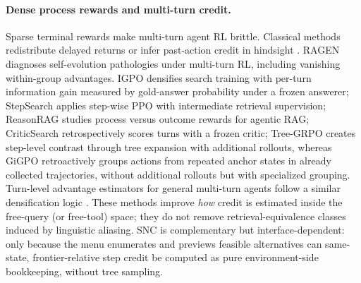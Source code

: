 \documentclass[letterpaper]{article} %
\begin{document}
\paragraph{Dense process rewards and multi-turn credit.}
Sparse terminal rewards make multi-turn agent RL brittle.
Classical methods redistribute delayed returns or infer past-action credit in hindsight \citep{arjona2019rudder,harutyunyan2019hca}.
RAGEN \citep{wang2025ragen} diagnoses self-evolution pathologies under multi-turn RL, including vanishing within-group advantages.
IGPO \citep{igpo2025} densifies search training with per-turn information gain measured by gold-answer probability under a frozen answerer; StepSearch \citep{wang2025stepsearch} applies step-wise PPO with intermediate retrieval supervision; ReasonRAG \citep{zhang2025reasonrag} studies process versus outcome rewards for agentic RAG; CriticSearch \citep{zhang2026criticsearch} retrospectively scores turns with a frozen critic; Tree-GRPO \citep{treegrpo2025} creates step-level contrast through tree expansion with additional rollouts, whereas GiGPO \citep{feng2025gigpo} retroactively groups actions from repeated anchor states in already collected trajectories, without additional rollouts but with specialized grouping.
Turn-level advantage estimators for general multi-turn agents follow a similar densification logic \citep{wei2025turnlevel,li2025turnppo}.
These methods improve \emph{how} credit is estimated inside the free-query (or free-tool) space; they do not remove retrieval-equivalence classes induced by linguistic aliasing.
SNC is complementary but interface-dependent: only because the menu enumerates and previews feasible alternatives can same-state, frontier-relative step credit be computed as pure environment-side bookkeeping, without tree sampling.
\end{document}
